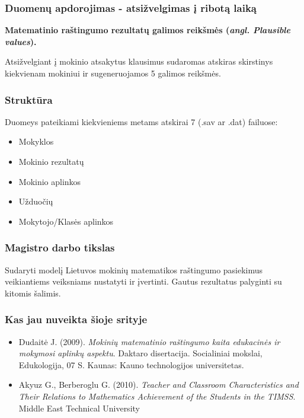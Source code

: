 \documentclass[utf8,hyperref={unicode,pdftex}]{beamer}
\begin{document}
\begin{frame}
\frametitle{Duomenų apdorojimas - atsižvelgimas į ribotą laiką}
\begin{large}
\textbf{Matematinio raštingumo rezultatų galimos reikšmės (\textit{angl. Plausible values}).}
\end{large}
Atsižvelgiant į mokinio atsakytus klausimus sudaromas atskiras skirstinys kiekvienam mokiniui ir sugeneruojamos 5 galimos reikšmės.
\end{frame}

\begin{frame}
\frametitle{Struktūra}
Duomeys pateikiami kiekvieniems metams atskirai 7 (.sav ar .dat) failuose:
\begin{itemize}
\item Mokyklos
\item Mokinio rezultatų
\item Mokinio aplinkos
\item Užduočių
\item Mokytojo/Klasės aplinkos
\end{itemize}
\end{frame}

\begin{frame}
\frametitle{Magistro darbo tikslas}
\Large
Sudaryti modelį Lietuvos mokinių matematikos raštingumo pasiekimus veikiantiems veiksniams nustatyti ir įvertinti. Gautus rezultatus palyginti su kitomis šalimis.
\end{frame}

\begin{frame}
\frametitle{Kas jau nuveikta šioje srityje}
\begin{Large}
\begin{itemize}
\item Dudaitė J. (2009). \textit{Mokinių matematinio raštingumo kaita edukacinės ir mokymosi aplinkų aspektu}. Daktaro disertacija. Socialiniai mokslai, Edukologija, 07 S. Kaunas: Kauno technologijos universitetas. 
\item Akyuz G., Berberoglu G. (2010). \textit{Teacher and Classroom Characteristics and Their Relations to Mathematics Achievement of the Students in the TIMSS}. Middle East Technical University
\end{itemize}
\end{Large}
\end{frame}
\end{document}
